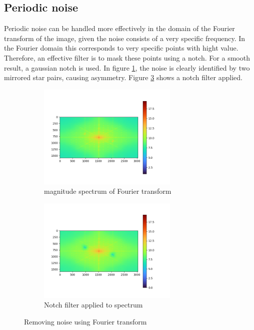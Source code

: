\documentclass{report}
\begin{document}
\subsection{Periodic noise}
Periodic noise can be handled more effectively in the domain of the Fourier transform of the image, given the noise consists of a very specific frequency. In the Fourier domain this corresponds to very specific points with hight value. Therefore, an effective filter is to mask these points using a notch. For a smooth result, a gaussian notch is used. In figure \ref{fig:fourrier}, the noise is clearly identified by two mirrored star pairs, causing asymmetry. Figure \ref{fig:fourrier_notch} shows a notch filter applied.

\begin{figure}[H]
    \centering
    \begin{subfigure}[b]{0.45\linewidth}
        \centering
        \includegraphics[height=50mm, keepaspectratio]{report_images/plots/fourrier.png}
        \caption{magnitude spectrum of Fourier transform}
        \label{fig:fourrier}
    \end{subfigure}
    \hfill
    \begin{subfigure}[b]{0.45\linewidth}
        \centering
        \includegraphics[height=50mm, keepaspectratio]{report_images/plots/fourrier_notch.png}
        \caption{Notch filter applied to spectrum}
        \label{fig:fourrier_notch}
    \end{subfigure}
    \caption{Removing noise using Fourier transform}
\end{figure}
\end{document}

